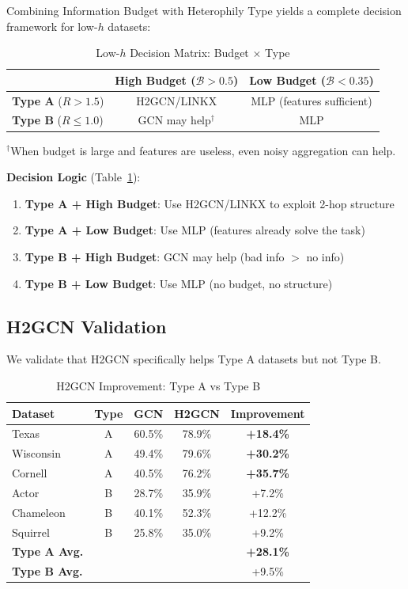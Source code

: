Combining Information Budget with Heterophily Type yields a complete decision framework for low-$h$ datasets:

\begin{table}[t]
\centering
\caption{Low-$h$ Decision Matrix: Budget $\times$ Type}
\label{tab:low_h_matrix}
\begin{tabular}{@{}l|cc@{}}
\toprule
 & \textbf{High Budget} ($\mathcal{B} > 0.5$) & \textbf{Low Budget} ($\mathcal{B} < 0.35$) \\
\midrule
\textbf{Type A} ($R > 1.5$) & H2GCN/LINKX & MLP (features sufficient) \\
\textbf{Type B} ($R \leq 1.0$) & GCN may help$^\dag$ & MLP \\
\bottomrule
\end{tabular}
\vspace{1mm}
\raggedright\small $^\dag$When budget is large and features are useless, even noisy aggregation can help.
\end{table}

\textbf{Decision Logic} (Table~\ref{tab:low_h_matrix}):
\begin{enumerate}
    \item \textbf{Type A + High Budget}: Use H2GCN/LINKX to exploit 2-hop structure
    \item \textbf{Type A + Low Budget}: Use MLP (features already solve the task)
    \item \textbf{Type B + High Budget}: GCN may help (bad info $>$ no info)
    \item \textbf{Type B + Low Budget}: Use MLP (no budget, no structure)
\end{enumerate}

\subsection{H2GCN Validation}

We validate that H2GCN specifically helps Type A datasets but not Type B.

\begin{table}[t]
\centering
\caption{H2GCN Improvement: Type A vs Type B}
\label{tab:h2gcn_validation}
\begin{tabular}{@{}lcccc@{}}
\toprule
\textbf{Dataset} & \textbf{Type} & \textbf{GCN} & \textbf{H2GCN} & \textbf{Improvement} \\
\midrule
Texas & A & 60.5\% & 78.9\% & \textbf{+18.4\%} \\
Wisconsin & A & 49.4\% & 79.6\% & \textbf{+30.2\%} \\
Cornell & A & 40.5\% & 76.2\% & \textbf{+35.7\%} \\
\midrule
Actor & B & 28.7\% & 35.9\% & +7.2\% \\
Chameleon & B & 40.1\% & 52.3\% & +12.2\% \\
Squirrel & B & 25.8\% & 35.0\% & +9.2\% \\
\midrule
\textbf{Type A Avg.} & & & & \textbf{+28.1\%} \\
\textbf{Type B Avg.} & & & & +9.5\% \\
\bottomrule
\end{tabular}
\end{table}

